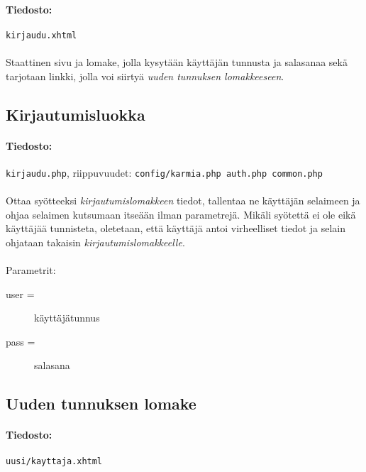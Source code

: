 \documentclass[11pt]{article}
\begin{document}
\paragraph{Tiedosto:} \large{\texttt{kirjaudu.xhtml}}

\paragraph{} Staattinen sivu ja lomake, jolla kysytään käyttäjän tunnusta ja salasanaa sekä tarjotaan linkki, jolla voi siirtyä \emph{uuden tunnuksen lomakkeeseen}.


\subsection{Kirjautumisluokka}

\paragraph{Tiedosto:} \large{\texttt{kirjaudu.php}}, riippuvuudet: \texttt{config/karmia.php auth.php common.php}

\paragraph{} Ottaa syötteeksi \emph{kirjautumislomakkeen} tiedot, tallentaa ne käyttäjän selaimeen ja ohjaa selaimen kutsumaan itseään ilman parametrejä. Mikäli syötettä ei ole eikä käyttäjää tunnisteta, oletetaan, että käyttäjä antoi virheelliset tiedot ja selain ohjataan takaisin \emph{kirjautumislomakkeelle}.

\paragraph{} Parametrit:
\begin{description}
\item[user =] käyttäjätunnus
\item[pass =] salasana
\end{description}


\subsection{Uuden tunnuksen lomake}

\paragraph{Tiedosto:} \large{\texttt{uusi/kayttaja.xhtml}}
\end{document}
